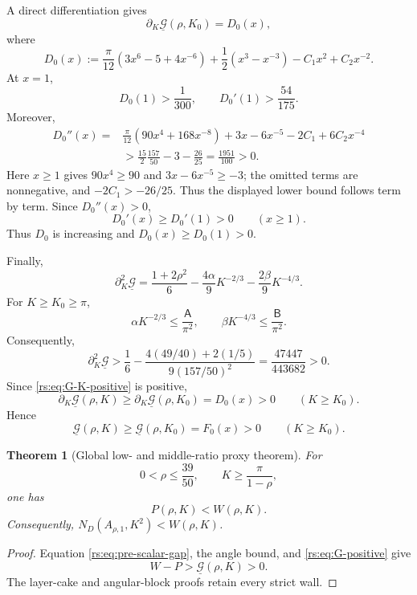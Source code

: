\documentclass[11pt]{article}
\newtheorem{theorem}{Theorem}
\theoremstyle{remark}
\begin{document}
A direct differentiation gives
\begin{equation}
 \partial_K\underline{\mathcal G}(\rho,K_0)=D_0(x),
 \label{rs:eq:base-derivative}
\end{equation}
where
\begin{equation}
 D_0(x):=
 \frac\pi{12}(3x^6-5+4x^{-6})
 +\frac12(x^3-x^{-3})-C_1x^2+C_2x^{-2}.
 \label{rs:eq:D0}
\end{equation}
At $x=1$,
\begin{equation}
 D_0(1)>\frac1{300},
 \qquad D_0'(1)>\frac{54}{175}.
 \label{rs:eq:D0-endpoint}
\end{equation}
Moreover,
\begin{equation}
 \begin{aligned}
 D_0''(x)={}&\frac\pi{12}(90x^4+168x^{-8})
 +3x-6x^{-5}-2C_1+6C_2x^{-4}\\
 &>\frac{15}{2}\frac{157}{50}-3-\frac{26}{25}
 =\frac{1951}{100}>0.
 \end{aligned}
 \label{rs:eq:D0-convex}
\end{equation}
Here $x\geq1$ gives $90x^4\geq90$ and
$3x-6x^{-5}\geq-3$; the omitted terms are nonnegative, and
$-2C_1>-26/25$.  Thus the displayed lower bound follows term by term.
Since $D_0''(x)>0$,
\[
 D_0'(x)\geq D_0'(1)>0\qquad(x\geq1).
\]
Thus $D_0$ is increasing and $D_0(x)\geq D_0(1)>0$.

Finally,
\begin{equation}
 \partial_K^2\underline{\mathcal G}
 =\frac{1+2\rho^2}{6}
 -\frac{4\alpha}{9}K^{-2/3}
 -\frac{2\beta}{9}K^{-4/3}.
 \label{rs:eq:G-K-convex}
\end{equation}
For $K\geq K_0\geq\pi$,
\[
 \alpha K^{-2/3}\leq\frac{\mathsf A}{\pi^2},
 \qquad
 \beta K^{-4/3}\leq\frac{\mathsf B}{\pi^2}.
\]
Consequently,
\begin{equation}
 \partial_K^2\underline{\mathcal G}
 >\frac16-
 \frac{4(49/40)+2(1/5)}{9(157/50)^2}
 =\frac{47447}{443682}>0.
 \label{rs:eq:G-K-positive}
\end{equation}
Since \eqref{rs:eq:G-K-positive} is positive,
\[
 \partial_K\underline{\mathcal G}(\rho,K)
 \geq\partial_K\underline{\mathcal G}(\rho,K_0)
 =D_0(x)>0
 \qquad(K\geq K_0).
\]
Hence
\begin{equation}
 \underline{\mathcal G}(\rho,K)
 \geq\underline{\mathcal G}(\rho,K_0)
 =F_0(x)>0
 \qquad(K\geq K_0).
 \label{rs:eq:G-positive}
\end{equation}

\begin{theorem}[Global low- and middle-ratio proxy theorem]
\label{rs:thm:global-proxy}
For
\[
 0<\rho\leq\frac{39}{50},
 \qquad K\geq\frac\pi{1-\rho},
\]
one has
\begin{equation}
 P(\rho,K)<W(\rho,K).
 \label{rs:eq:proxy-conclusion}
\end{equation}
Consequently,
$N_D(A_{\rho,1},K^2)<W(\rho,K)$.
\end{theorem}

\begin{proof}
Equation \eqref{rs:eq:pre-scalar-gap}, the angle bound, and
\eqref{rs:eq:G-positive} give
\[
 W-P>\underline{\mathcal G}(\rho,K)>0.
\]
The layer-cake and angular-block proofs retain every strict wall.
\end{proof}
\end{document}

